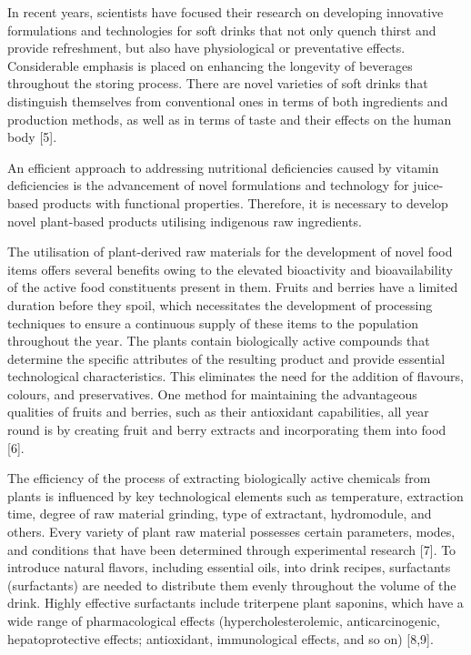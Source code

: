 In recent years, scientists have focused their research on developing
innovative formulations and technologies for soft drinks that not only
quench thirst and provide refreshment, but also have physiological or
preventative effects. Considerable emphasis is placed on enhancing the
longevity of beverages throughout the storing process. There are novel
varieties of soft drinks that distinguish themselves from conventional
ones in terms of both ingredients and production methods, as well as in
terms of taste and their effects on the human body {[}5{]}.~

An efficient approach to addressing nutritional deficiencies caused by
vitamin deficiencies is the advancement of novel formulations and
technology for juice-based products with functional properties.
Therefore, it is necessary to develop novel plant-based products
utilising indigenous raw ingredients.~

The utilisation of plant-derived raw materials for the development of
novel food items offers several benefits owing to the elevated
bioactivity and bioavailability of the active food constituents present
in them. Fruits and berries have a limited duration before they spoil,
which necessitates the development of processing techniques to ensure a
continuous supply of these items to the population throughout the year.
The plants contain biologically active compounds that determine the
specific attributes of the resulting product and provide essential
technological characteristics. This eliminates the need for the addition
of flavours, colours, and preservatives. One method for maintaining the
advantageous qualities of fruits and berries, such as their antioxidant
capabilities, all year round is by creating fruit and berry extracts and
incorporating them into food {[}6{]}.~

The efficiency of the process of extracting biologically active
chemicals from plants is influenced by key technological elements such
as temperature, extraction time, degree of raw material grinding, type
of extractant, hydromodule, and others. Every variety of plant raw
material possesses certain parameters, modes, and conditions that have
been determined through experimental research {[}7{]}. To introduce
natural flavors, including essential oils, into drink recipes,
surfactants (surfactants) are needed to distribute them evenly
throughout the volume of the drink. Highly effective surfactants include
triterpene plant saponins, which have a wide range of pharmacological
effects (hypercholesterolemic, anticarcinogenic, hepatoprotective
effects; antioxidant, immunological effects, and so on) {[}8,9{]}.

